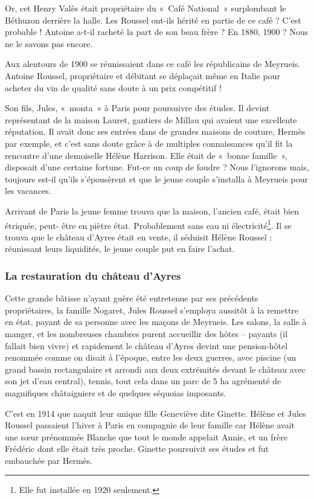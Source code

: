 Or, cet Henry Valès était propriétaire du «~Café National~» surplombant le Béthuzon derrière la
halle. Les Roussel ont-ils hérité en partie de ce café ? C’est probable ! Antoine a-t-il racheté la
part de son beau frère ? En 1880, 1900 ? Nous ne le savons pas encore.

Aux alentours de 1900 se réunissaient dans ce café les républicains de Meyrueis. Antoine
Roussel, propriétaire et débitant se déplaçait même en Italie pour acheter du vin de qualité
sans doute à un prix compétitif !

Son fils, Jules, «~monta~» à Paris pour poursuivre des études. Il devint représentant de la
maison Lauret, gantiers de Millau qui avaient une excellente réputation. Il avait donc ses
entrées dans de grandes maisons de couture, Hermès par exemple, et c’est sans doute grâce à
de multiples connaissances qu’il fit la rencontre d’une demoiselle Hélène Harrison. Elle était
de «~bonne famille~», disposait d’une certaine fortune. Fut-ce un coup de foudre ? Nous
l’ignorons mais, toujours est-il qu’ils s’épousèrent et que le jeune couple s’installa à Meyrueis
pour les vacances.

Arrivant de Paris la jeune femme trouva que la maison, l’ancien café, était bien étriquée, peut-
être en piètre état. Probablement sans eau ni électricité\footnote{Elle fut installée en 1920 seulement.}.
Il se trouva que le château d’Ayres était en vente, il séduisit Hélène Roussel : réunissant leurs
liquidités, le jeune couple put en faire l’achat.

\subsubsection{La restauration du château d’Ayres}

Cette grande bâtisse n’ayant guère été entretenue par ses précédents propriétaires, la famille
Nogaret, Jules Roussel s’employa aussitôt à la remettre en état, payant de sa personne avec
les maçons de Meyrueis. Les salons, la salle à manger, et les nombreuses chambres purent
accueillir des hôtes – payants (il fallait bien vivre) et rapidement le château d’Ayres devint
une pension-hôtel renommée comme on disait à l’époque, entre les deux guerres, avec
piscine (un grand bassin rectangulaire et arrondi aux deux extrémités devant le château avec
son jet d’eau central), tennis, tout cela dans un parc de 5 ha agrémenté de magnifiques
châtaigniers et de quelques séquoias imposants.

C’est en 1914 que naquit leur unique fille Geneviève dite Ginette. Hélène et Jules Roussel
passaient l’hiver à Paris en compagnie de leur famille car Hélène avait une sœur prénommée
Blanche que tout le monde appelait Annie, et un frère Frédéric dont elle était très proche.
Ginette poursuivit ses études et fut embauchée par Hermès.

